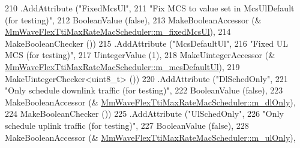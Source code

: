 \begin{DoxyCode}
210          .AddAttribute (\textcolor{stringliteral}{"FixedMcsUl"},
211                                                                         \textcolor{stringliteral}{"Fix MCS to value set in
       McsUlDefault (for testing)"},
212                                                                         BooleanValue (\textcolor{keyword}{false}),
213                                                                         MakeBooleanAccessor (&
      \hyperlink{classns3_1_1MmWaveFlexTtiMaxRateMacScheduler_aa726b9bb7889308bfb3688db1bbc6923}{MmWaveFlexTtiMaxRateMacScheduler::m\_fixedMcsUl}),
214                                                                         MakeBooleanChecker ())
215         .AddAttribute (\textcolor{stringliteral}{"McsDefaultUl"},
216                                                                  \textcolor{stringliteral}{"Fixed UL MCS (for testing)"},
217                                                                  UintegerValue (1),
218                                                                  MakeUintegerAccessor (&
      \hyperlink{classns3_1_1MmWaveFlexTtiMaxRateMacScheduler_a2c3b6f1fd3e3105407557c1179a0e2e3}{MmWaveFlexTtiMaxRateMacScheduler::m\_mcsDefaultUl}),
219                                                                  MakeUintegerChecker<uint8\_t> ())
220          .AddAttribute (\textcolor{stringliteral}{"DlSchedOnly"},
221                                                                         \textcolor{stringliteral}{"Only schedule downlink traffic
       (for testing)"},
222                                                                         BooleanValue (\textcolor{keyword}{false}),
223                                                                         MakeBooleanAccessor (&
      \hyperlink{classns3_1_1MmWaveFlexTtiMaxRateMacScheduler_a56628e8b65ac83d0971cb578424a69d1}{MmWaveFlexTtiMaxRateMacScheduler::m\_dlOnly}),
224                                                                         MakeBooleanChecker ())
225          .AddAttribute (\textcolor{stringliteral}{"UlSchedOnly"},
226                                                                         \textcolor{stringliteral}{"Only schedule uplink traffic (for
       testing)"},
227                                                                         BooleanValue (\textcolor{keyword}{false}),
228                                                                         MakeBooleanAccessor (&
      \hyperlink{classns3_1_1MmWaveFlexTtiMaxRateMacScheduler_ac5fe9ebd47ddd56e08672f4ab97d08be}{MmWaveFlexTtiMaxRateMacScheduler::m\_ulOnly}),

\end{DoxyCode}
